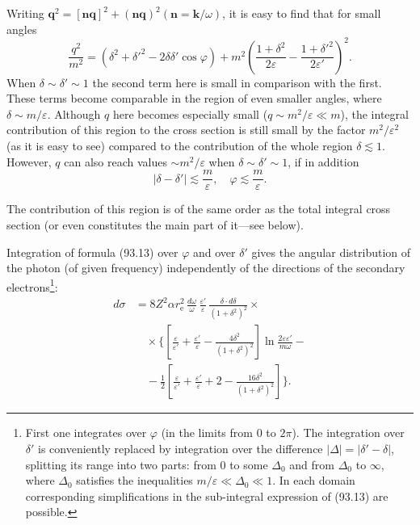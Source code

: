 Writing $\mathbf{q}^2 = [\mathbf{nq}]^2 + (\mathbf{nq})^2(\mathbf{n} = \mathbf{k}/\omega)$, it is easy to find that for small angles
\begin{equation}
\frac{q^2}{m^2} = (\delta^2 + \delta'^2 - 2\delta\delta'\cos\varphi) + m^2\!\left(\frac{1+\delta^2}{2\varepsilon} - \frac{1+\delta'^2}{2\varepsilon'}\right)^{\!2}.
\label{eq:93.14}
\end{equation}
When $\delta \sim \delta' \sim 1$ the second term here is small in comparison with the first. These terms become comparable in the region of even smaller angles, where $\delta \sim m/\varepsilon$. Although $q$ here becomes especially small ($q \sim m^2/\varepsilon \ll m$), the integral contribution of this region to the cross section is still small by the factor $m^2/\varepsilon^2$ (as it is easy to see) compared to the contribution of the whole region $\delta \lesssim 1$. However, $q$ can also reach values $\sim m^2/\varepsilon$ when $\delta \sim \delta' \sim 1$, if in addition
\begin{equation}
|\delta - \delta'| \lesssim \frac{m}{\varepsilon}, \quad \varphi \lesssim \frac{m}{\varepsilon}.
\label{eq:93.15}
\end{equation}

The contribution of this region is of the same order as the total integral cross section (or even constitutes the main part of it---see below).

Integration of formula (93.13) over $\varphi$ and over $\delta'$ gives the angular distribution of the photon (of given frequency) independently of the directions of the secondary electrons\footnote{First one integrates over $\varphi$ (in the limits from 0 to $2\pi$). The integration over $\delta'$ is conveniently replaced by integration over the difference $|\Delta| = |\delta'-\delta|$, splitting its range into two parts: from 0 to some $\Delta_0$ and from $\Delta_0$ to $\infty$, where $\Delta_0$ satisfies the inequalities $m/\varepsilon \ll \Delta_0 \ll 1$. In each domain corresponding simplifications in the sub-integral expression of (93.13) are possible.}:
\begin{equation}
\begin{split}
d\sigma &= 8Z^2\alpha r_\mathrm{e}^2\,\frac{d\omega}{\omega}\,\frac{\varepsilon'}{\varepsilon}\,\frac{\delta\cdot d\delta}{(1+\delta^2)^2} \times {} \\
&\quad \times \biggl\{\left[\frac{\varepsilon}{\varepsilon'} + \frac{\varepsilon'}{\varepsilon} - \frac{4\delta^2}{(1+\delta^2)^2}\right]\ln\frac{2\varepsilon\varepsilon'}{m\omega} - {} \\
&\quad {} - \frac{1}{2}\left[\frac{\varepsilon}{\varepsilon'} + \frac{\varepsilon'}{\varepsilon} + 2 - \frac{16\delta^2}{(1+\delta^2)^2}\right]\biggr\}.
\end{split}
\label{eq:93.16}
\end{equation}

